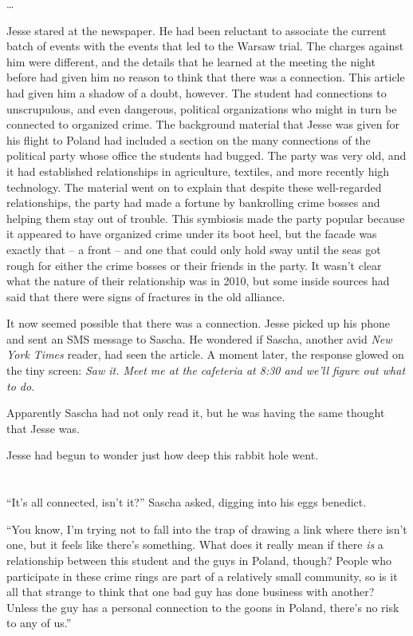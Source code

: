 \documentclass[12pt]{book}
\begin{document}
\indent\indent\dots
	
Jesse stared at the newspaper.  He had been reluctant to associate the current batch of events with the events that led to the Warsaw trial.  The charges against him were different, and the details that he learned at the meeting the night before had given him no reason to think that there was a connection.  This article had given him a shadow of a doubt, however.  The student had connections to unscrupulous, and even dangerous, political organizations who might in turn be connected to organized crime.  The background material that Jesse was given for his flight to Poland had included a section on the many connections of the political party whose office the students had bugged.  The party was very old, and it had established relationships in agriculture, textiles, and more recently high technology.  The material went on to explain that despite these well-regarded relationships, the party had made a fortune by bankrolling crime bosses and helping them stay out of trouble.  This symbiosis made the party popular because it appeared to have organized crime under its boot heel, but the facade was exactly that -- a front -- and one that could only hold sway until the seas got rough for either the crime bosses or their friends in the party.  It wasn't clear what the nature of their relationship was in 2010, but some inside sources had said that there were signs of fractures in the old alliance.

It now seemed possible that there was a connection.  Jesse picked up his phone and sent an SMS message to Sascha.  He wondered if Sascha, another avid \emph{New York Times} reader, had seen the article.  A moment later, the response glowed on the tiny screen: \emph{Saw it.  Meet me at the cafeteria at 8:30 and we'll figure out what to do}.

Apparently Sascha had not only read it, but he was having the same thought that Jesse was.

Jesse had begun to wonder just how deep this rabbit hole went.

\chapter{}

``It's all connected, isn't it?'' Sascha asked, digging into his eggs benedict.

``You know, I'm trying not to fall into the trap of drawing a link where there isn't one, but it feels like there's something.  What does it really mean if there \emph{is} a relationship between this student and the guys in Poland, though?  People who participate in these crime rings are part of a relatively small community, so is it all that strange to think that one bad guy has done business with another?  Unless the guy has a personal connection to the goons in Poland, there's no risk to any of us.''
\end{document}
